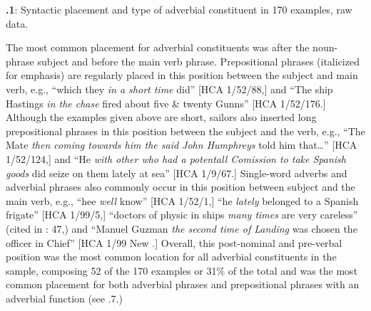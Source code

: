  

\textbf{.1}: Syntactic placement and type of adverbial constituent in 170 examples, raw data.

The most common placement for adverbial constituents was after the noun-phrase subject and before the main verb phrase. Prepositional phrases (italicized for emphasis) are regularly placed in this position between the subject and main verb, e.g., “which they \textit{in a short time} did” [HCA 1/52/88,] and “The ship Hastings \textit{in the chase} fired about five \& twenty Gunns” [HCA 1/52/176.] Although the examples given above are short, sailors also inserted long prepositional phrases in this position between the subject and the verb, e.g., “The Mate \textit{then coming towards him the said John Humphreys} told him that…” [HCA 1/52/124,] and “He \textit{with other who had a potentall Comission to take Spanish goods} did seize on them lately at sea” [HCA 1/9/67.] Single-word adverbs and adverbial phrases also commonly occur in this position between subject and the main verb, e.g., “hee \textit{well} know” [HCA 1/52/1,] “he \textit{lately} belonged to a Spanish frigate” [HCA 1/99/5,] “doctors of physic in ships \textit{many times} are very careless” (cited in \citealt{Brown2011}: 47,) and “Manuel Guzman \textit{the second time of Landing} was chosen the officer in Chief” [HCA 1/99 New \citealt{Providence1722}.] Overall, this post-nominal and pre-verbal position was the most common location for all adverbial constituents in the sample, composing 52 of the 170 examples or 31\% of the total and was the most common placement for both adverbial phrases and prepositional phrases with an adverbial function (see .7.) 

